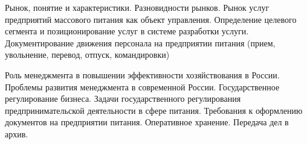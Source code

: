 \documentclass[
	11pt,
	a4paper,
	]
	{article}
\begin{document}
\bigskip

\noindent{} 
	{
		Рынок, понятие и характеристики. Разновидности рынков. Рынок услуг предприятий массового питания как объект управления.
	}{
		Определение целевого сегмента и позиционирование услуг в системе разработки услуги.
	}{
		Документирование движения персонала на предприятии питания (прием, увольнение, перевод, отпуск, командировки)
	}

\bigskip

\noindent{} 
	{
		Роль менеджмента в повышении эффективности хозяйствования в России. Проблемы развития менеджмента в современной России.
	}{
		Государственное регулирование бизнеса. Задачи государственного регулирования предпринимательской деятельности в сфере питания.
	}{
		Требования к оформлению документов на предприятии питания. Оперативное хранение. Передача дел в архив.
	}

\bigskip
\end{document}

